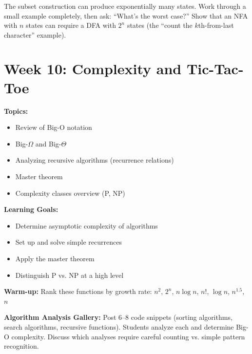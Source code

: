\documentclass[11pt]{article}
\begin{document}
\begin{tipbox}
The subset construction can produce exponentially many states. Work through a small example completely, then ask: ``What's the worst case?'' Show that an NFA with $n$ states can require a DFA with $2^n$ states (the ``count the $k$th-from-last character'' example).
\end{tipbox}

\newpage
\section{Week 10: Complexity and Tic-Tac-Toe}

\begin{classabox}
\textbf{Topics:}
\begin{itemize}
    \item Review of Big-O notation
    \item Big-$\Omega$ and Big-$\Theta$
    \item Analyzing recursive algorithms (recurrence relations)
    \item Master theorem
    \item Complexity classes overview (P, NP)
\end{itemize}

\textbf{Learning Goals:}
\begin{itemize}
    \item Determine asymptotic complexity of algorithms
    \item Set up and solve simple recurrences
    \item Apply the master theorem
    \item Distinguish P vs. NP at a high level
\end{itemize}

\textbf{Warm-up:} Rank these functions by growth rate:
$n^2$, $2^n$, $n \log n$, $n!$, $\log n$, $n^{1.5}$, $n$
\end{classabox}

\begin{activitybox}
\textbf{Algorithm Analysis Gallery:} Post 6--8 code snippets (sorting algorithms, search algorithms, recursive functions). Students analyze each and determine Big-O complexity. Discuss which analyses require careful counting vs. simple pattern recognition.
\end{activitybox}
\end{document}
